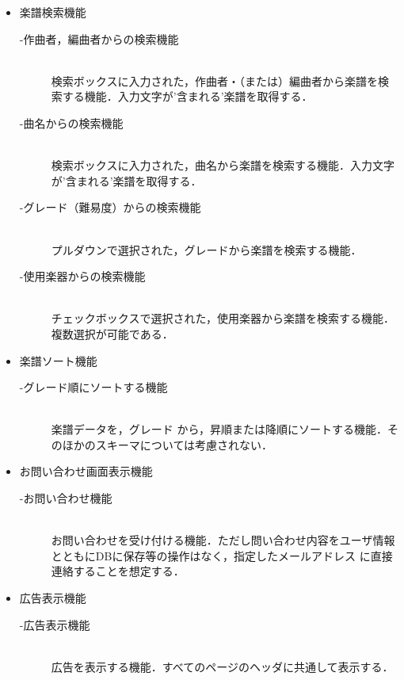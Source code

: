 \begin{itemize}
    \item 楽譜検索機能
          \begin{description}
              \item[-作曲者，編曲者からの検索機能]\mbox{}\\
              検索ボックスに入力された，作曲者・（または）編曲者から楽譜を検索する機能．入力文字が'含まれる'楽譜を取得する．
              \item[-曲名からの検索機能] \mbox{}\\
                  検索ボックスに入力された，曲名から楽譜を検索する機能．入力文字が'含まれる'楽譜を取得する．
              \item[-グレード（難易度）からの検索機能] \mbox{}\\
                  プルダウンで選択された，グレードから楽譜を検索する機能．
              \item[-使用楽器からの検索機能] \mbox{}\\
                  チェックボックスで選択された，使用楽器から楽譜を検索する機能．複数選択が可能である．
          \end{description}
    \item 楽譜ソート機能
          \begin{description}
              \item[-グレード順にソートする機能] \mbox{}\\
                  楽譜データを，グレード
                  から，昇順または降順にソートする機能．そのほかのスキーマについては考慮されない．
          \end{description}
    \item お問い合わせ画面表示機能
          \begin{description}
              \item[-お問い合わせ機能]\mbox{}\\
              お問い合わせを受け付ける機能．ただし問い合わせ内容をユーザ情報とともにDBに保存等の操作はなく，指定したメールアドレス
              に直接連絡することを想定する．
          \end{description}
    \item 広告表示機能
          \begin{description}
              \item[-広告表示機能]\mbox{}\\
              広告を表示する機能．すべてのページのヘッダに共通して表示する．
          \end{description}
\end{itemize}

